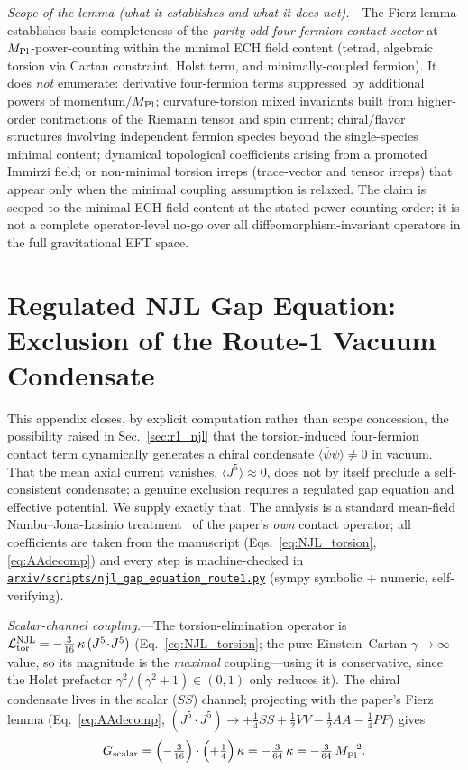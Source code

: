 \documentclass[aps,prd,twocolumn,superscriptaddress,showpacs,preprintnumbers,nofootinbib,longbibliography,floatfix]{revtex4-2}
\newcommand{\repoBase}{https://github.com/Hubify-Projects/bigbounce/blob/main}
\providecommand{\artifact}[1]{\href{\repoBase/#1}{\nolinkurl{#1}}}
\begin{document}
\textit{Scope of the lemma (what it establishes and what it does not).}---The
Fierz lemma establishes basis-completeness of the \emph{parity-odd four-fermion
contact sector} at $M_{\rm Pl}$-power-counting within the minimal ECH field
content (tetrad, algebraic torsion via Cartan constraint, Holst term, and
minimally-coupled fermion). It does \emph{not} enumerate: derivative four-fermion
terms suppressed by additional powers of momentum/$M_{\rm Pl}$; curvature-torsion
mixed invariants built from higher-order contractions of the Riemann tensor and
spin current; chiral/flavor structures involving independent fermion species
beyond the single-species minimal content; dynamical topological coefficients
arising from a promoted Immirzi field; or non-minimal torsion irreps
(trace-vector and tensor irreps) that appear only when the minimal coupling
assumption is relaxed. The claim is scoped to the minimal-ECH field content at
the stated power-counting order; it is not a complete operator-level no-go over
all diffeomorphism-invariant operators in the full gravitational EFT space.

\section{Regulated NJL Gap Equation: Exclusion of the Route-1 Vacuum
Condensate}\label{app:njl_gap}
This appendix closes, by explicit computation rather than scope concession,
the possibility raised in Sec.~\ref{sec:r1_njl} that the torsion-induced
four-fermion contact term dynamically generates a chiral condensate
$\langle\bar\psi\psi\rangle\neq0$ in vacuum. That the mean axial current
vanishes, $\langle J^5\rangle\approx0$, does not by itself preclude a
self-consistent condensate; a genuine exclusion requires a regulated gap
equation and effective potential. We supply exactly that. The analysis is a
standard mean-field Nambu--Jona-Lasinio treatment~\cite{Klevansky1992,%
HatsudaKunihiro1994} of the paper's \emph{own} contact operator; all
coefficients are taken from the manuscript (Eqs.~\eqref{eq:NJL_torsion},
\eqref{eq:AAdecomp}) and every step is machine-checked in
\artifact{arxiv/scripts/njl\_gap\_equation\_route1.py} (sympy symbolic
$+$ numeric, self-verifying).

\emph{Scalar-channel coupling.}---The torsion-elimination operator is
$\mathcal{L}^{\rm NJL}_{\rm tor}=-\tfrac{3}{16}\,\kappa\,(J^5\!\cdot\!J^5)$
(Eq.~\eqref{eq:NJL_torsion}; the pure Einstein--Cartan $\gamma\to\infty$
value, so its magnitude is the \emph{maximal} coupling---using it is
conservative, since the Holst prefactor $\gamma^2/(\gamma^2+1)\in(0,1)$ only
reduces it). The chiral condensate lives in the scalar ($SS$) channel;
projecting with the paper's Fierz lemma (Eq.~\eqref{eq:AAdecomp},
$(J^5\!\cdot\!J^5)\to+\tfrac14 SS+\tfrac12 VV-\tfrac12 AA-\tfrac14 PP$) gives
\begin{equation}\label{eq:gscalar}
G_{\rm scalar}=\Bigl(-\tfrac{3}{16}\Bigr)\cdot\Bigl(+\tfrac14\Bigr)\,\kappa
=-\tfrac{3}{64}\,\kappa=-\tfrac{3}{64}\,M_{\rm Pl}^{-2}.
\end{equation}
\end{document}
